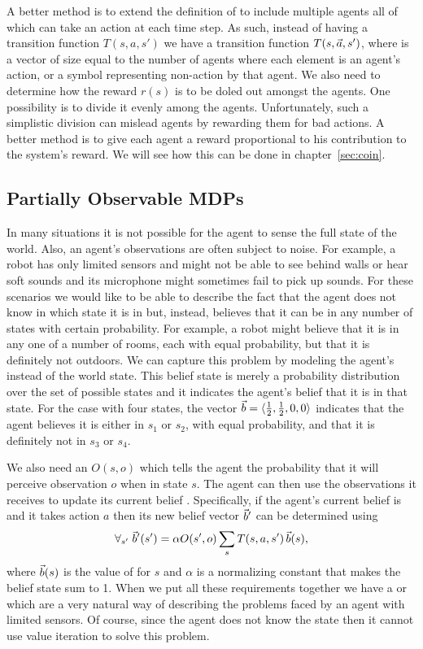 A better method is to extend the definition of  to include
multiple agents all of which can take an action at each time step. As
such, instead of having a transition function $T(s,a,s')$ we have a
transition function $T(s,\vec{a},s')$, where \va{} is a vector of size
equal to the number of agents where each element is an agent's action,
or a symbol representing non-action by that agent. We also need to
determine how the reward $r(s)$ is to be doled out amongst the agents.
One possibility is to divide it evenly among the agents.
Unfortunately, such a simplistic division can mislead agents by
rewarding them for bad actions. A better method is to give each agent
a reward proportional to his contribution to the system's reward. We
will see how this can be done in chapter~\ref{sec:coin}.

\subsection{Partially Observable MDPs}
\label{sec:part-observ-mdps}

In many situations it is not possible for the agent to sense the full
state of the world. Also, an agent's observations are often subject to
noise. For example, a robot has only limited sensors and might not be
able to see behind walls or hear soft sounds and its microphone might
sometimes fail to pick up sounds. For these scenarios we would like to
be able to describe the fact that the agent does not know in which
state it is in but, instead, believes that it can be in any number of
states with certain probability. For example, a robot might believe
that it is in any one of a number of rooms, each with equal
probability, but that it is definitely not outdoors. We can capture
this problem by modeling the agent's  \vb{} instead
of the world state. This belief state is merely a probability
distribution over the set of possible states and it indicates the
agent's belief that it is in that state.  For the case with four
states, the vector $\vec{b} = \langle \frac{1}{2}, \frac{1}{2}, 0,
0\rangle$ indicates that the agent believes it is either in $s_1$ or
$s_2$, with equal probability, and that it is definitely not in $s_3$
or $s_4$.

We also need an  $O(s,o)$ which tells the agent
the probability that it will perceive observation $o$ when in state
$s$. The agent can then use the observations it receives to update its
current belief \vb{}. Specifically, if the agent's current belief is
\vb{} and it takes action $a$ then its new belief vector $\vec{b}'$ can be
determined using
\begin{equation}
  \label{eq:pomdp-belief-update}
  \forall_{s'} \; \vec{b}'(s') = \alpha O(s', o) \sum_s T(s,a,s')\, \vec{b}(s),
\end{equation}
where $\vec{b}(s)$ is the value of \vb{} for $s$ and $\alpha$ is a
normalizing constant that makes the belief state sum to 1. When we put
all these requirements together we have a  or  which are a very natural
way of describing the problems faced by an agent with limited sensors.
Of course, since the agent does not know the state then it cannot use
value iteration to solve this problem.

